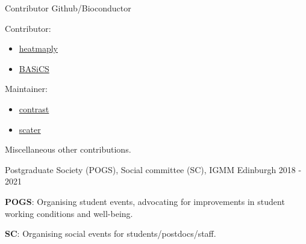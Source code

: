 


\begin{cventries}



\cventry 
{Contributor}
{Github/Bioconductor}
{}
{}
{
  \begin{cvitems}
    \item {
      Contributor:
      \begin{itemize}
        \item
          \href{%
            https://cran.r-project.org/web/packages/heatmaply/index.html
          }{
            heatmaply
          }
        \item
          \href{%
            http://bioconductor.org/packages/release/bioc/html/BASiCS.html
          }{
            BASiCS
          }
      \end{itemize}
    }
    \item {
      Maintainer:
      \begin{itemize}
        \item
          \href{%
            https://cran.r-project.org/web/packages/contrast/index.html
          }{
            contrast
          }
        \item
          \href{%
            http://bioconductor.org/packages/release/bioc/html/scater.html
          }{
            scater
          }
      \end{itemize}
    }
    \item {
      Miscellaneous other contributions.
    }
  \end{cvitems}
}

 {
  Postgraduate Society (POGS), Social committee (SC), IGMM
} {
  Edinburgh
} {
  2018 - 2021
} {
  \begin{cvitems}
    \item {
      \textbf{POGS}: Organising student events, advocating for improvements in student working
      conditions and well-being.
    }
    \item {
      \textbf{SC}: Organising social events for students/postdocs/staff.
    }
  \end{cvitems}
}


\end{cventries}
